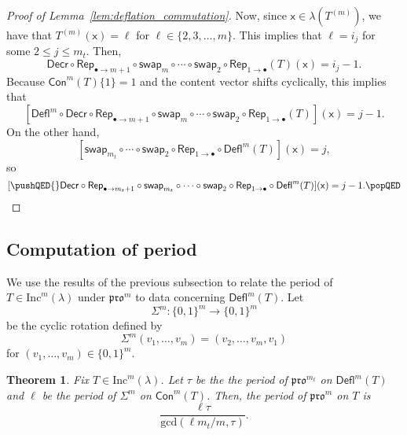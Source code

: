 \documentclass[12pt]{amsart}
\newcommand{\x}{\ensuremath{\mathsf{x}}}
\newtheorem{theorem}{Theorem}[section]
\theoremstyle{definition}
\theoremstyle{remark}
\numberwithin{equation}{section}
\newcommand{\inc}{\ensuremath{\mathrm{Inc}}}
\newcommand{\pro}{\mathfrak{pro}}
\newcommand{\swap}{\ensuremath{\mathsf{swap}}}
\newcommand{\decr}{\ensuremath{\mathsf{Decr}}}
\newcommand{\rep}{\ensuremath{\mathsf{Rep}}}
\newcommand{\deflate}{\ensuremath{\mathsf{Defl}}}
\newcommand{\content}{\ensuremath{\mathsf{Con}}}
\begin{document}
\begin{proof}[Proof of Lemma~\ref{lem:deflation_commutation}]
Now, since $\x \in \lambda(T^{(m)})$, we have that $T^{(m)}(\x) = \ell$ for $\ell \in \{2,3,\dots,m\}$. This implies that $\ell = i_j$ for some $2 \leq j \leq m_t$. Then, 
\[
\decr \circ \rep_{\bullet \to m+1} \circ \swap_m \circ \cdots \circ \swap_2 \circ \rep_{1 \rightarrow \bullet} (T)(\x) = i_j-1.
\]
Because $\content^m(T) \lbrace 1 \rbrace = 1$ and the content vector shifts cyclically, this implies that 
 \[
 [\deflate^m \circ \decr \circ \rep_{\bullet \rightarrow m+1} \circ \swap_m \circ \cdots \circ \swap_2 \circ \rep_{1 \rightarrow \bullet} (T)](\x) = j-1.
 \]
  On the other hand, 
  \[
  [\swap_{m_t} \circ \cdots \circ \swap_2 \circ \rep_{1 \rightarrow \bullet} \circ \deflate^m(T)](\x) = j,
  \]
   so 
   \[
   [ \pushQED{\qed} \decr \circ \rep_{\bullet \rightarrow m_t + 1} \circ \swap_{m_t} \circ \cdots \circ \swap_2 \circ \rep_{1 \rightarrow \bullet} \circ  \deflate^m(T)](\x) = j-1. \qedhere \popQED \] \let\qed\relax
\end{proof}

\subsection{Computation of period}\label{sec:period} We use the results of the previous subsection to relate the period of $T \in \inc^m(\lambda)$ under $\pro^m$ to data concerning $\deflate^m(T)$. Let 
\[\Sigma^m : \lbrace 0,1\rbrace^m \rightarrow \lbrace 0,1\rbrace^m\]
 be the cyclic rotation defined by 
 \[
 \Sigma^m(v_1, \dots, v_m) = (v_2, \dots, v_m, v_1)
 \]
  for $(v_1, \dots, v_m) \in \lbrace 0,1 \rbrace^m$. 
  
\begin{theorem}\label{thm:periodthm}
Fix $T \in \inc^m(\lambda)$. Let $\tau$ be the the period of $\pro^{m_t}$ on $\deflate^m(T)$ and $\ell$ be the period of $\Sigma^m$ on $\content^m(T)$. Then, the period of $\pro^m$ on $T$ is \[\frac{\ell  \tau}{\mathrm{gcd}(\ell m_t / m,\tau)}. \]
\end{theorem} 
    
\end{document}
